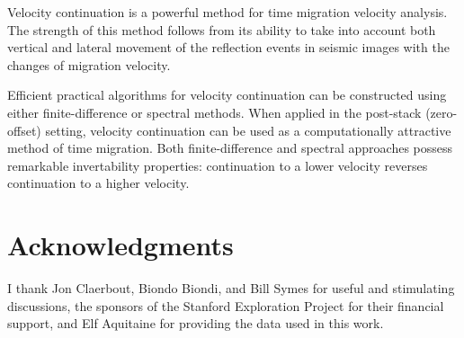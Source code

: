 Velocity continuation is a powerful method for time migration velocity
analysis.  The strength of this method follows from its ability to take into
account both vertical and lateral movement of the reflection events in seismic
images with the changes of migration velocity.

Efficient practical algorithms for velocity continuation can be constructed
using either finite-difference or spectral methods. When applied in the
post-stack (zero-offset) setting, velocity continuation can be used as a
computationally attractive method of time migration. Both finite-difference
and spectral approaches possess remarkable invertability properties:
continuation to a lower velocity reverses continuation to a higher velocity.


\section{Acknowledgments}

I thank Jon Claerbout, Biondo Biondi, and Bill Symes for useful and
stimulating discussions, the sponsors of the Stanford Exploration Project for
their financial support, and Elf Aquitaine for providing the data used in this
work. 

\newpage



